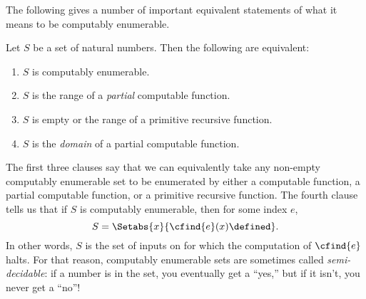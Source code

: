 \documentclass[../../../include/open-logic-section]{subfiles}
\begin{document}



The following gives a number of important equivalent statements of
what it means to be computably enumerable.

\begin{thm}
Let $S$ be a set of natural numbers. Then the following are
equivalent:
\begin{enumerate}
\item $S$ is computably enumerable.
\item $S$ is the range of a \emph{partial} computable function.
\item $S$ is empty or the range of a primitive recursive function.
\item $S$ is the \emph{domain} of a partial computable function.
\end{enumerate}
\end{thm}

\begin{explain}
The first three clauses say that we can equivalently take any non-empty
computably enumerable set to be enumerated by either a computable
function, a partial computable function, or a primitive recursive
function. The fourth clause tells us that if $S$ is computably
enumerable, then for some index $e$,
\[
S = \Setabs{x}{\cfind{e}(x) \defined}.
\]
In other words, $S$ is the set of inputs on for which the computation
of $\cfind{e}$ halts. For that reason, computably enumerable sets are
sometimes called \emph{semi-decidable}: if a number is in the set, you
eventually get a ``yes,'' but if it isn't, you never get a ``no''!{}
\end{explain}
\end{document}
